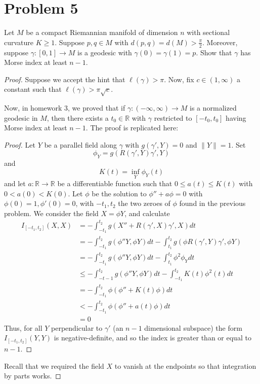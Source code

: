 \documentclass[fontsize=11pt]{scrartcl} %
\numberwithin{equation}{section} %
\numberwithin{figure}{section} %
\numberwithin{table}{section} %
\newcommand{\R}{\mathbb{R}}
\begin{document}
\newpage

\section*{Problem 5}
Let $M$ be a compact Riemannian manifold of dimension $n$ with sectional
curvature $K\geq 1$. Suppose $p,q\in M$ with $d(p,q)=d(M)>\frac{\pi}{2}$.
Moreover, suppose $\gamma:[0,1]\to M$ is a geodesic with
$\gamma(0)=\gamma(1)=p$. Show that $\gamma$ has Morse index at least $n-1$.

\begin{proof}
    Suppose we accept the hint that $\ell(\gamma)>\pi$. Now, fix $c\in
    (1,\infty)$ a constant such that $\ell(\gamma)>\pi\sqrt{c}$.

    Now, in homework 3, we proved that if $\gamma:(-\infty,\infty)\to M$ is a
    normalized geodesic in $M$, then there exists a $t_0\in \R$ with $\gamma$
    restricted to $[-t_0,t_0]$ having Morse index at least $n-1$. The proof is
    replicated here:

    \begin{proof}
    Let $Y$ be a parallel field along $\gamma$ with $g(\gamma',Y)=0$ and
    $\|Y\|=1$. Set
    \[
        \phi_Y = g(R(\gamma',Y)\gamma',Y)
    \]
    and
    \[
        K(t) = \inf_Y\phi_Y(t)
    \]
    and let $a:\R\to\R$ be a differentiable function such that $0\leq a(t)\leq
    K(t)$ with $0<a(0)<K(0)$. Let $\phi$ be the solution to $\phi'' + a\phi = 0$
    with $\phi(0)=1,\phi'(0)=0$, with $-t_1,t_2$ the two zeroes of $\phi$ found
    in the previous problem. We consider the field $X = \phi Y$, and calculate
    \[
        \begin{aligned}
            I_{[-t_1,t_2]}(X,X) &= -\int_{-t_1}^{t_2}g(X'' +
            R(\gamma',X)\gamma',X)dt\\
            &= -\int_{-t_1}^{t_2}g(\phi''Y,\phi Y)dt - \int_{t_1}^{t_2}g(\phi
            R(\gamma',Y)\gamma',\phi Y)\\
            &= -\int_{-t_1}^{t_2}g(\phi''Y,\phi Y)dt -
            \int_{t_1}^{t_2}\phi^2\phi_Ydt\\
            &\leq -\int_{-t-1}^{t_2}g(\phi''Y,\phi Y)dt -
            \int_{-t_1}^{t_2}K(t)\phi^2(t)dt\\
            &=-\int_{-t_1}^{t_2}\phi(\phi'' + K(t)\phi)dt\\
            &<-\int_{-t_1}^{t_2}\phi(\phi'' + a(t)\phi)dt\\
            &=0
        \end{aligned}
    \]
    Thus, for all $Y$ perpendicular to $\gamma'$ (an $n-1$ dimensional subspace)
    the form $I_{[-t_1,t_2]}(Y,Y)$ is negative-definite, and so the index is
    greater than or equal to $n-1$. 
\end{proof}
    Recall that we required the field $X$ to vanish at the endpoints so that
    integration by parts works.


\end{proof}
\end{document}
